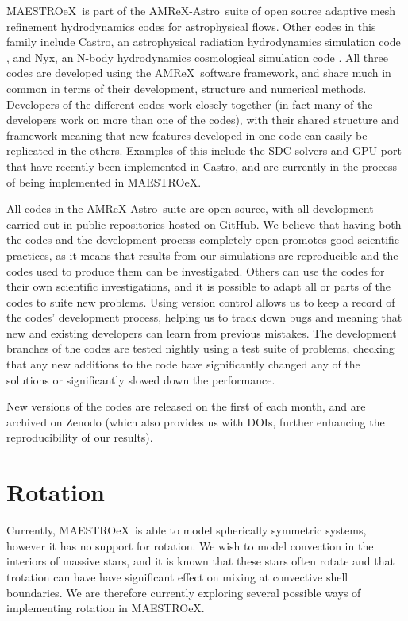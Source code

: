 \documentclass[a4paper]{jpconf}
\newcommand{\maestroex}{{\sffamily MAESTROeX}}
\newcommand{\castro}{{\sffamily Castro}}
\newcommand{\nyx}{{\sffamily Nyx}}
\newcommand{\amrex}{{\sffamily AMReX}}
\newcommand{\amrexastro}{{\sffamily AMReX-Astro}}
\newcommand{\MarginPar}[1]{\marginpar{\vskip-\baselineskip\raggedright\tiny\sffamily\hrule\smallskip{\color{red}#1}\par\smallskip\hrule}}
\begin{document}
\maestroex~is part of the \amrexastro~suite of open source adaptive mesh refinement hydrodynamics codes for astrophysical flows. Other codes in this family include \castro, an astrophysical radiation hydrodynamics simulation code \cite{Almgren2010}, and \nyx, an N-body hydrodynamics cosmological simulation code \cite{Almgren2013}. All three codes are developed using the \amrex~software framework, and share much in common in terms of their development, structure and numerical methods. Developers of the different codes work closely together (in fact many of the developers work on more than one of the codes), with their shared structure and framework meaning that new features developed in one code can easily be replicated in the others. Examples of this include the SDC solvers \cite{Zingale2019} and GPU port that have recently been implemented in \castro, and are currently in the process of being implemented in \maestroex. 

All codes in the \amrexastro~suite are open source, with all development carried out in public repositories hosted on GitHub. We believe that having both the codes and the development process completely open promotes good scientific practices, as it means that results from our simulations are reproducible and the codes used to produce them can be investigated.\MarginPar{I feel like there is a better word here than investigated} Others can use the codes for their own scientific investigations, and it is possible to adapt all or parts of the codes to suite new problems. Using version control allows us to keep a record of the codes' development process, helping us to track down bugs and meaning that new and existing developers can learn from previous mistakes. The development branches of the codes are tested nightly using a test suite of problems, checking that any new additions to the code have significantly changed any of the solutions or significantly slowed down the performance.

New versions of the codes are released on the first of each month, and are archived on Zenodo (which also provides us with DOIs, further enhancing the reproducibility of our results).


\section{Rotation} \label{sec:rotation}

Currently, \maestroex~is able to model spherically symmetric systems, however it has no support for rotation. We wish to model convection in the interiors of massive stars, and it is known that these stars often rotate and that trotation can have have significant effect on mixing at convective shell boundaries. We are therefore currently exploring several possible ways of implementing rotation in \maestroex. 
\end{document}
